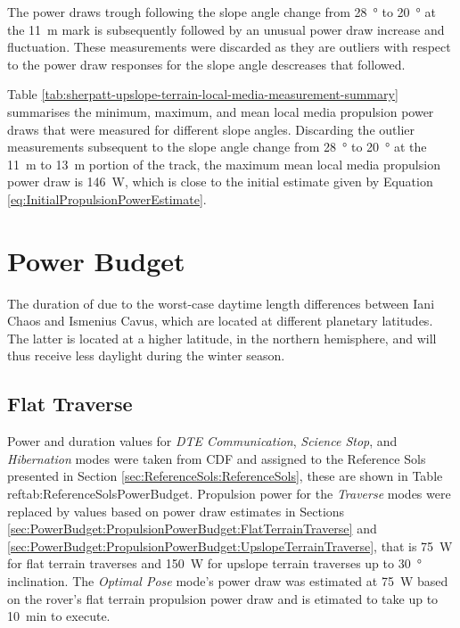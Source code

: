 The power draws trough following the slope angle change from \SI{28}{\degree} to \SI{20}{\degree} at the \SI{11}{\meter} mark is subsequently followed by an unusual power draw increase and fluctuation. These measurements were discarded as they are outliers with respect to the power draw responses for the slope angle descreases that followed.

Table \ref{tab:sherpatt-upslope-terrain-local-media-measurement-summary} summarises the minimum, maximum, and mean local media propulsion power draws that were measured for different slope angles. Discarding the outlier measurements subsequent to the slope angle change from \SI{28}{\degree} to \SI{20}{\degree} at the \SI{11}{\meter} to \SI{13}{\meter} portion of the track, the maximum mean local media propulsion power draw is \SI{146}{\watt}, which is close to the initial estimate given by Equation \ref{eq:InitialPropulsionPowerEstimate}.



\pagebreak
\section{Power Budget}
\label{sec:PowerBudget:PowerBudget}
The duration of  due to the worst-case daytime length differences between Iani Chaos and Ismenius Cavus, which are located at different planetary latitudes. The latter is located at a higher latitude, in the northern hemisphere, and will thus receive less daylight during the winter season.

\subsection{Flat Traverse}
\label{sec:PowerBudget:PowerBudget:FlatTraverse}

Power and duration values for \textit{DTE Communication}, \textit{Science Stop}, and \textit{Hibernation} modes were taken from \ac{CDF} and assigned to the Reference Sols presented in Section \ref{sec:ReferenceSols:ReferenceSols}, these are shown in Table ref{tab:ReferenceSolsPowerBudget}. Propulsion power for the \textit{Traverse} modes were replaced by values based on power draw estimates in Sections \ref{sec:PowerBudget:PropulsionPowerBudget:FlatTerrainTraverse} and \ref{sec:PowerBudget:PropulsionPowerBudget:UpslopeTerrainTraverse}, that is \SI{75}{\watt} for flat terrain traverses and \SI{150}{\watt} for upslope terrain traverses up to \SI{30}{\degree} inclination. The \textit{Optimal Pose} mode's power draw was estimated at \SI{75}{\watt} based on the rover's flat terrain propulsion power draw and is etimated to take up to \SI{10}{\minute} to execute.

